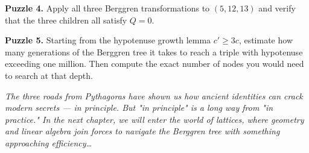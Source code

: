 \begin{displayquote}
\textbf{Puzzle 4.} Apply all three Berggren transformations to $(5, 12, 13)$ and verify that the three children all satisfy $Q = 0$.
\end{displayquote}



\begin{displayquote}
\textbf{Puzzle 5.} Starting from the hypotenuse growth lemma $c' \geq 3c$, estimate how many generations of the Berggren tree it takes to reach a triple with hypotenuse exceeding one million. Then compute the exact number of nodes you would need to search at that depth.
\end{displayquote}


\bigskip

\textit{The three roads from Pythagoras have shown us how ancient identities can crack modern secrets --- in principle. But "in principle" is a long way from "in practice." In the next chapter, we will enter the world of lattices, where geometry and linear algebra join forces to navigate the Berggren tree with something approaching efficiency…}
